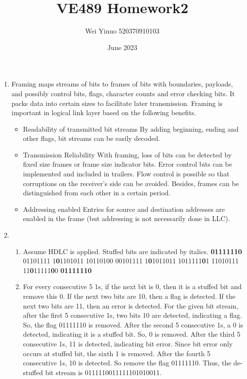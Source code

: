 \documentclass{article}
\title{VE489 Homework2}
\author{Wei Yinuo 520370910103}
\date{June 2023}
\begin{document}
\maketitle

\begin{enumerate}
    \item 
    Framing maps streams of bits to frames of bits with boundaries, payloads, and possibly control bits, flags, character counts and error checking bits. It packs data into certain sizes to facilitate later transmission.
    \newline
    Framing is important in logical link layer based on the following benefits.
    \begin{itemize}
        \item Readability of transmitted bit streams
        \newline
        By adding beginning, ending and other flags, bit streams can be easily decoded. 
        \item Transmission Reliability
        \newline
        With framing, loss of bits can be detected by fixed size frames or frame size indicator bits. Error control bits can be implemented and included in trailers. Flow control is possible so that corruptions on the receiver's side can be avoided.
        Besides, frames can be distinguished from each other in a certain period. 
        \item Addressing enabled
        \newline
        Entries for source and destination addresses are enabled in the frame (but addressing is not necessarily done in LLC). 
    \end{itemize}
    
    \item
    \begin{enumerate}[1)]
        \item 
        Assume HDLC is applied. 
        Stuffed bits are indicated by italics.
        \newline
        \textbf{01111110} 01101111 1\textbf{0}1101011 10110100 00101111 1\textbf{0}1011011 1011111\textbf{0}1 11010111 11\textbf{0}11111\textbf{0}0 \textbf{01111110}
        
        \item
        For every consecutive 5 1s, if the next bit is 0, then it is a stuffed bit and remove this 0. If the next two bits are 10, then a flag is detected. If the next two bits are 11, then an error is detected.
        \newline 
        For the given bit stream, after the first 5 consecutive 1s, two bits 10 are detected, indicating a flag. So, the flag 01111110 is removed. After the second 5 consecutive 1s, a 0 is detected, indicating it is a stuffed bit. So, 0 is removed. After the third 5 consecutive 1s, 11 is detected, indicating bit error. Since bit error only occurs at stuffed bit, the sixth 1 is removed. After the fourth 5 consecutive 1s, 10 is detected. So remove the flag 01111110. Thus, the de-stuffed bit stream is 
        0111110011111101010011.


\end{enumerate}
\end{enumerate}
\end{document}
